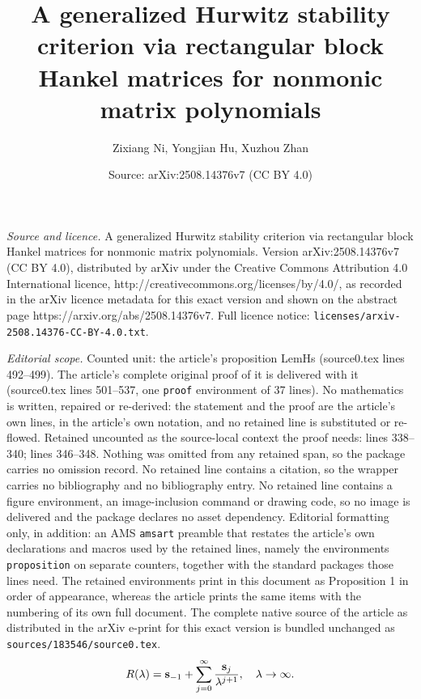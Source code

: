 \documentclass[10pt,a4paper]{amsart}
\title{A generalized Hurwitz stability criterion via rectangular block Hankel matrices for nonmonic matrix polynomials}
\author{Zixiang Ni, Yongjian Hu, Xuzhou Zhan}
\date{Source: arXiv:2508.14376v7 (CC BY 4.0)}
\begin{document}
\maketitle

\noindent\emph{Source and licence.} A generalized Hurwitz stability criterion via rectangular block Hankel matrices for nonmonic matrix polynomials. Version arXiv:2508.14376v7 (CC BY 4.0), distributed by arXiv under the Creative Commons Attribution 4.0 International licence, http://creativecommons.org/licenses/by/4.0/, as recorded in the arXiv licence metadata for this exact version and shown on the abstract page https://arxiv.org/abs/2508.14376v7. Full licence notice: \texttt{licenses/arxiv-2508.14376-CC-BY-4.0.txt}.\par\smallskip

\noindent\textit{Editorial scope.} Counted unit: the article's proposition LemHs (source0.tex lines 492--499). The article's complete original proof of it is delivered with it (source0.tex lines 501--537, one \texttt{proof} environment of 37 lines). No mathematics is written, repaired or re-derived: the statement and the proof are the article's own lines, in the article's own notation, and no retained line is substituted or re-flowed.  Retained uncounted as the source-local context the proof needs: lines 338--340; lines 346--348.  Nothing was omitted from any retained span, so the package carries no omission record.  No retained line contains a citation, so the wrapper carries no bibliography and no bibliography entry.  No retained line contains a figure environment, an image-inclusion command or drawing code, so no image is delivered and the package declares no asset dependency.  Editorial formatting only, in addition: an AMS \texttt{amsart} preamble that restates the article's own declarations and macros used by the retained lines, namely the environments \texttt{proposition} on separate counters, together with the standard packages those lines need.  The retained environments print in this document as Proposition 1 in order of appearance, whereas the article prints the same items with the numbering of its own full document.  The complete native source of the article as distributed in the arXiv e-print for this exact version is bundled unchanged as \texttt{sources/183546/source0.tex}.
\begin{equation}\label{LaurentSeriesRsp}
       R(\lambda)={\bf s}_{-1}+\sum_{j=0}^{\infty} \frac{{\bf s}_j}{\lambda^{j+1}},\quad \lambda\rightarrow \infty.
     \end{equation}
\end{document}
